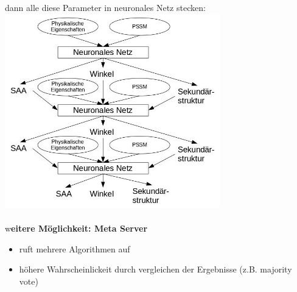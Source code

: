 dann alle diese Parameter in neuronales Netz stecken:\\
\includegraphics[width=0.7\textwidth]{lectures/160530/pix/neuro_net.jpg}
\\\\
w\textbf{eitere Möglichkeit: Meta Server}\\
\begin{itemize}
	\item ruft mehrere Algorithmen auf
	\item höhere Wahrscheinlickeit durch vergleichen der Ergebnisse (z.B. majority vote)
\end{itemize}
